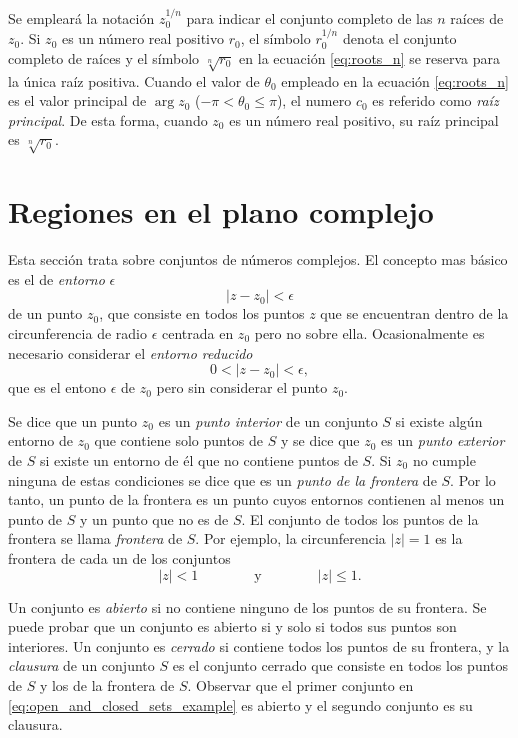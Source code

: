 \documentclass[a4paper]{report}
\begin{document}
Se empleará la notación \(z_0^{1/n}\) para indicar el conjunto completo de las \(n\) raíces de \(z_0\). Si \(z_0\) es un número real positivo \(r_0\), el símbolo \(r_0^{1/n}\) denota el conjunto completo de raíces y el símbolo \(\sqrt[n]{r_0}\) en la ecuación \ref{eq:roots_n} se reserva para la única raíz positiva. Cuando el valor de \(\theta_0\) empleado en la ecuación \ref{eq:roots_n} es el valor principal de \(\arg z_0\) (\(-\pi<\theta_0\leq\pi\)), el numero \(c_0\) es referido como \emph{raíz principal}. De esta forma, cuando \(z_0\) es un número real positivo, su raíz principal es \(\sqrt[n]{r_0}\).

\section{Regiones en el plano complejo}\label{sec:complex_plane_regions}

Esta sección trata sobre conjuntos de números complejos. El concepto mas básico es el de \emph{entorno} \(\epsilon\)
\[
 |z-z_0|<\epsilon
\]
de un punto \(z_0\), que consiste en todos los puntos \(z\) que se encuentran dentro de la circunferencia de radio \(\epsilon\) centrada en \(z_0\) pero no sobre ella. Ocasionalmente es necesario considerar el \emph{entorno reducido}
\[
 0<|z-z_0|<\epsilon,
\]
que es el entono \(\epsilon\) de \(z_0\) pero sin considerar el punto \(z_0\).

Se dice que un punto \(z_0\) es un \emph{punto interior} de un conjunto \(S\) si existe algún entorno de \(z_0\) que contiene solo puntos de \(S\) y se dice que \(z_0\) es un \emph{punto exterior} de \(S\) si existe un entorno de él que no contiene puntos de \(S\). Si \(z_0\) no cumple ninguna de estas condiciones se dice que es un \emph{punto de la frontera} de \(S\). Por lo tanto, un punto de la frontera es un punto cuyos entornos contienen al menos un punto de \(S\) y un punto que no es de \(S\). El conjunto de todos los puntos de la frontera se llama \emph{frontera} de \(S\). Por ejemplo, la circunferencia \(|z|=1\) es la frontera de cada un de los conjuntos
\begin{equation}\label{eq:open_and_closed_sets_example}
 |z|<1
 \qquad\qquad\textrm{y}\qquad\qquad
 |z|\leq1.
\end{equation}

Un conjunto es \emph{abierto} si no contiene ninguno de los puntos de su frontera. Se puede probar que un conjunto es abierto si y solo si todos sus puntos son interiores. Un conjunto es \emph{cerrado} si contiene todos los puntos de su frontera, y la \emph{clausura} de un conjunto \(S\) es el conjunto cerrado que consiste en todos los puntos de \(S\) y los de la frontera de \(S\). Observar que el primer conjunto en \ref{eq:open_and_closed_sets_example} es abierto y el segundo conjunto es su clausura.
\end{document}
